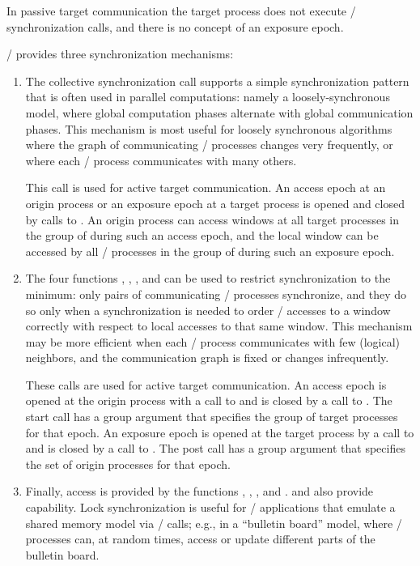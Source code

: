 In passive target communication the target
process does not execute \RMA/ synchronization calls, and there is no
concept of an exposure 
epoch. 

\MPI/ provides three synchronization mechanisms:
\begin{enumerate}
\item
The
 collective synchronization call supports a
simple synchronization pattern that is often used in parallel
computations: namely a loosely-synchronous model, where global
computation phases alternate with global communication phases.
This mechanism is most useful for loosely synchronous algorithms where
the graph of communicating \mpi/ processes changes very frequently, or where
each \mpi/ process communicates with many 
others.

This call is used for active target communication.  An access epoch at an
origin process or an exposure epoch at a target process is opened
and closed by calls to .  An origin process can
access windows at all target processes in the group of  during
such an access
epoch, and the local window can be accessed by all \mpi/ processes in the
group of  during such an exposure epoch.
\item
The four functions , 
,
, and
can be used to restrict synchronization to the minimum: only
pairs of communicating \mpi/ processes synchronize, and they do so only when
a synchronization is needed to order \RMA/ accesses to a
window correctly with respect to local accesses to that same window.
This mechanism may be 
more efficient when each \mpi/ process communicates with few (logical)
neighbors, and the communication graph is fixed or changes
infrequently.

These calls are used for 
active target communication.  An access epoch is opened
at the origin process
with a call to  and is closed by a call to
.  The start call has a group argument
that specifies the group of target processes for that
epoch. An exposure epoch is opened at the
target process by a call
to  and is closed by a call to
.  The post call has a group argument that
specifies the set of origin processes for that 
epoch.
\item
Finally, 
access is provided by the functions ,
, , and
.   and
 also provide  capability.
Lock synchronization
is useful for \MPI/ applications that
emulate a shared memory model via \MPI/ calls; e.g., in a ``bulletin board''
model, where \mpi/ processes can, at random times, access or update
different parts of the bulletin board.


\end{enumerate}
